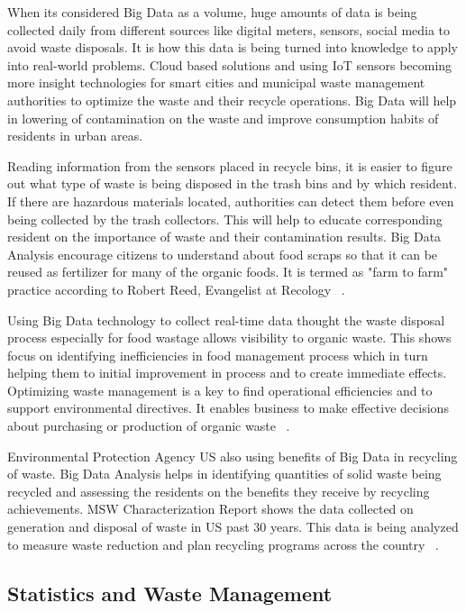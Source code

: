 \documentclass[sigconf]{acmart}
\begin{document}
When its considered Big Data as a volume, huge amounts of data is being collected daily from different sources like digital meters, sensors, social media to avoid waste disposals. It is how this data is being turned into knowledge to apply into real-world problems. Cloud based solutions and using IoT sensors becoming more insight technologies for smart cities and municipal waste management authorities to optimize the waste and their recycle operations. Big Data will help in lowering of contamination on the waste and improve consumption habits of residents in urban areas.

Reading information from the sensors placed in recycle bins, it is easier to figure out what type of waste is being disposed in the trash bins and by which resident. If there are hazardous materials located, authorities can detect them before even being collected by the trash collectors. This will help to educate corresponding resident on the importance of waste and their contamination results. Big Data Analysis encourage citizens to understand about food scraps so that it can be reused as fertilizer for many of the organic foods. It is termed as "farm to farm" practice according to Robert Reed, Evangelist at Recology ~\cite{james2012}.

Using Big Data technology to collect real-time data thought the waste disposal process especially for food wastage allows visibility to organic waste. This shows focus on identifying inefficiencies in food management process which in turn helping them to initial improvement in process and to create immediate effects. Optimizing waste management is a key to find operational efficiencies and to support environmental directives. It enables business to make effective decisions about purchasing or production of organic waste ~\cite{frank2016}.

Environmental Protection Agency US also using benefits of Big Data in recycling of waste. Big Data Analysis helps in identifying quantities of solid waste being recycled and assessing the residents on the benefits they receive by recycling achievements. MSW Characterization Report shows the data collected on generation and disposal of waste in US past 30 years. This data is being analyzed to measure waste reduction and plan recycling programs across the country ~\cite{epaRecycleBenefits2007}.


\subsection{Statistics and Waste Management}
\end{document}
